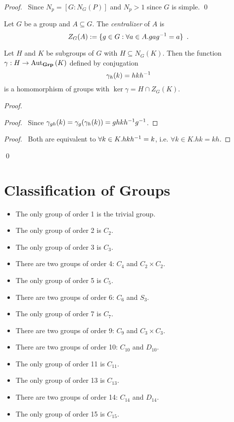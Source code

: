 \begin{proof}
\pf\ Since $N_p = [G : N_G(P)]$ and $N_p > 1$ since $G$ is simple. \qed
\end{proof}

\begin{df}[Centralizer]
Let $G$ be a group and $A \subseteq G$. The \emph{centralizer} of $A$ is
\[ Z_G(A) := \{ g \in G : \forall a \in A. ga{g}^{-1} = a \} \enspace . \]
\end{df}


\begin{prop}
Let $H$ and $K$ be subgroups of $G$ with $H \subseteq N_G(K)$. Then the function $\gamma : H \rightarrow \mathrm{Aut}_{\mathbf{Grp}} \left( {K} \right)$ defined by conjugation
\[ \gamma_h(k) = hk{h}^{-1} \]
is a homomorphism of groups with $\ker \gamma = H \cap Z_G(K)$.
\end{prop}

\begin{proof}
\pf
{}
\begin{proof}
	\pf\ Since $\gamma_{gh}(k) = \gamma_g(\gamma_h(k)) = ghk{h}^{-1}{g}^{-1}$.
\end{proof}
\begin{proof}
	\pf\ Both are equivalent to $\forall k \in K. hk{h}^{-1} = k$, i.e. $\forall k \in K. hk = kh$.
\end{proof}
\qed
\end{proof}

\chapter{Classification of Groups}

\begin{ex}
\begin{itemize}
\item The only group of order 1 is the trivial group.
\item The only group of order 2 is $C_2$.
\item The only group of order 3 is $C_3$.
\item There are two groups of order 4: $C_4$ and $C_2 \times C_2$.
\item The only group of order 5 is $C_5$.
\item There are two groups of order 6: $C_6$ and $S_3$.
\item The only group of order 7 is $C_7$.
\item There are two groups of order 9: $C_9$ and $C_3 \times C_3$.
\item There are two groups of order 10: $C_{10}$ and $D_{10}$.
\item The only group of order 11 is $C_{11}$.
\item The only group of order 13 is $C_{13}$.
\item There are two groups of order 14: $C_{14}$ and $D_{14}$.
\item The only group of order 15 is $C_{15}$.
\end{itemize}
\end{ex}

